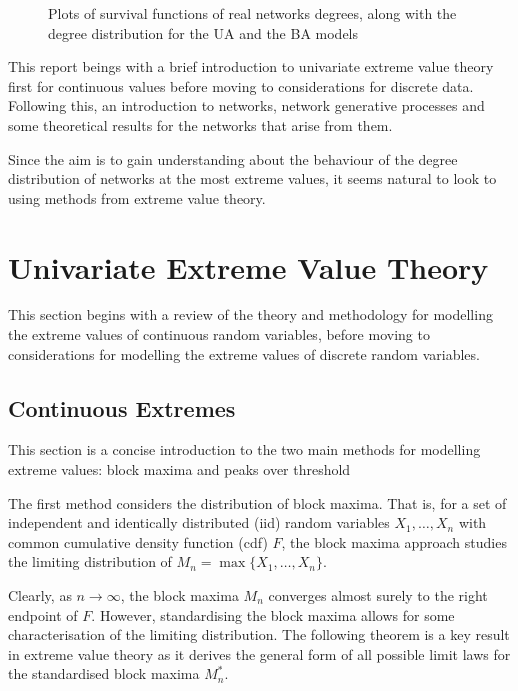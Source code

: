 \documentclass[
  10pt,
  a4paper,
]{scrreprt}
\theoremstyle{definition}
\theoremstyle{plain}
\theoremstyle{plain}
\theoremstyle{remark}
\begin{document}
{\begin{figure}[H]
{}

\caption{\label{fig-survs1}Plots of survival functions of real networks
degrees, along with the degree distribution for the UA and the BA
models}

\end{figure}

This report beings with a brief introduction to univariate extreme value
theory first for continuous values before moving to considerations for
discrete data. Following this, an introduction to networks, network
generative processes and some theoretical results for the networks that
arise from them.

Since the aim is to gain understanding about the behaviour of the degree
distribution of networks at the most extreme values, it seems natural to
look to using methods from extreme value theory.

\hypertarget{sec-ext}{%
\chapter{Univariate Extreme Value Theory}\label{sec-ext}}

This section begins with a review of the theory and methodology for
modelling the extreme values of continuous random variables, before
moving to considerations for modelling the extreme values of discrete
random variables.

\hypertarget{sec-ce}{%
\section{Continuous Extremes}\label{sec-ce}}

This section is a concise introduction to the two main methods for
modelling extreme values: block maxima and peaks over threshold

The first method considers the distribution of block maxima. That is,
for a set of independent and identically distributed (iid) random
variables \(X_1,\ldots,X_n\) with common cumulative density function
(cdf) \(F\), the block maxima approach studies the limiting distribution
of \(M_n = \max\{X_1,\ldots,X_n\}\).

Clearly, as \(n\rightarrow \infty\), the block maxima \(M_n\) converges
almost surely to the right endpoint of \(F\). However, standardising the
block maxima allows for some characterisation of the limiting
distribution. The following theorem is a key result in extreme value
theory as it derives the general form of all possible limit laws for the
standardised block maxima \(M_n^*\).

}
\end{document}
